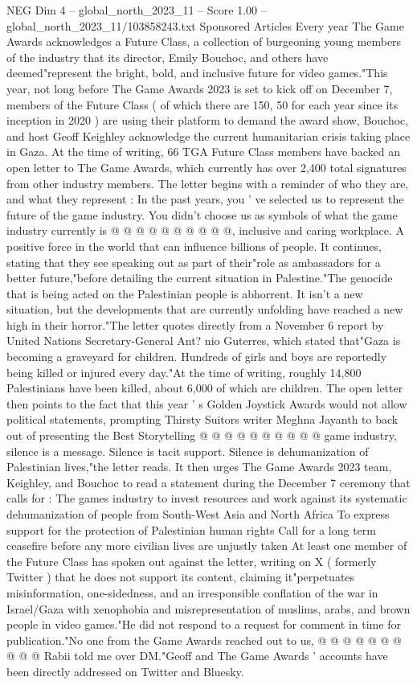 \begin{textsample}{NEG Dim 4 – global\_north\_2023\_11 – Score 1.00 – global\_north\_2023\_11/103858243.txt}  \label{ex:f4_neg_256}
Sponsored Articles Every year The Game Awards acknowledges a Future Class, a collection of burgeoning young members of the industry that its director, Emily Bouchoc, and others have deemed"represent the bright, bold, and inclusive future for video games."This year, not long before The Game Awards 2023 is set to kick off on December 7, members of the Future Class ( of which there are 150, 50 for each year since its inception in 2020 ) are using their platform to demand the award show, Bouchoc, and host Geoff Keighley acknowledge the current humanitarian crisis taking place in Gaza.
At the time of writing, 66 TGA Future Class members have backed an open letter to The Game Awards, which currently has over 2,400 total signatures from other industry members.
The letter begins with a reminder of who they are, and what they represent : In the past years, you ' ve selected us to represent the future of the game industry.
You didn't choose us as symbols of what the game industry currently is @ @ @ @ @ @ @ @ @ @, inclusive and caring workplace.
A positive force in the world that can influence billions of people.
It continues, stating that they see speaking out as part of their"role as ambassadors for a better future,"before detailing the current situation in Palestine."The genocide that is being acted on the Palestinian people is abhorrent.
It isn't a new situation, but the developments that are currently unfolding have reached a new high in their horror."The letter quotes directly from a November 6 report by United Nations Secretary-General Ant? nio Guterres, which stated that"Gaza is becoming a graveyard for children.
Hundreds of girls and boys are reportedly being killed or injured every day."At the time of writing, roughly 14,800 Palestinians have been killed, about 6,000 of which are children.
The open letter then points to the fact that this year ' s Golden Joystick Awards would not allow political statements, prompting Thirsty Suitors writer Meghna Jayanth to back out of presenting the Best Storytelling @ @ @ @ @ @ @ @ @ @ game industry, silence is a message.
Silence is tacit support.
Silence is dehumanization of Palestinian lives,"the letter reads.
It then urges The Game Awards 2023 team, Keighley, and Bouchoc to read a statement during the December 7 ceremony that calls for : The games industry to invest resources and work against its systematic dehumanization of people from South-West Asia and North Africa To express support for the protection of Palestinian human rights Call for a long term ceasefire before any more civilian lives are unjustly taken At least one member of the Future Class has spoken out against the letter, writing on X ( formerly Twitter ) that he does not support its content, claiming it"perpetuates misinformation, one-sidedness, and an irresponsible conflation of the war in Israel/Gaza with xenophobia and misrepresentation of muslims, arabs, and brown people in video games."He did not respond to a request for comment in time for publication."No one from the Game Awards reached out to us, @ @ @ @ @ @ @ @ @ @ Rabii told me over DM."Geoff and The Game Awards ' accounts have been directly addressed on Twitter and Bluesky.

\end{textsample}
